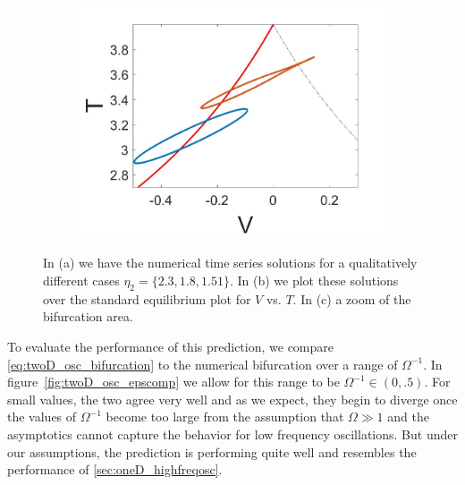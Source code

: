 \begin{figure}[H]
\begin{subfigure}{.5\textwidth}
  \includegraphics[width=\linewidth]{twoD/osc_bif_Tplot_zoom.jpg}
  \caption{}
\end{subfigure}
\caption{In (a) we have the numerical time series solutions for a qualitatively different cases $\eta_2=\{2.3,1.8,1.51\}$. In (b) we plot these solutions over the standard equilibrium plot for $V$ vs. $T$. In (c) a zoom of the bifurcation area.}
\label{fig:twoD_osc_Tnumerics}
\end{figure}

To evaluate the performance of this prediction, we compare \eqref{eq:twoD_osc_bifurcation} to the numerical bifurcation over a range of $\Omega^{-1}$. In figure~\ref{fig:twoD_osc_epscomp} we allow for this range to be $\Omega^{-1}\in (0,.5)$. For small values, the two agree very well and as we expect, they begin to diverge once the values of $\Omega^{-1}$ become too large from the assumption that $\Omega\gg 1$ and the asymptotics cannot capture the behavior for low frequency oscillations. But under our assumptions, the prediction is performing quite well and resembles the performance of \autoref{sec:oneD_highfreqosc}.

